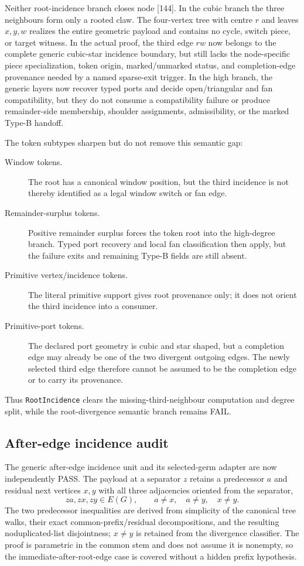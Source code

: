 \documentclass[11pt]{article}
\begin{document}
Neither root-incidence branch closes node [144].  In the cubic branch the
three neighbours form only a rooted claw.  The four-vertex tree with centre
$r$ and leaves $x,y,w$ realizes the entire geometric payload and contains no
cycle, switch piece, or target witness.  In the actual proof, the third edge
$rw$ now belongs to the complete generic cubic-star incidence boundary, but
still lacks the node-specific piece specialization, token origin,
marked/unmarked status, and completion-edge provenance needed by a named
sparse-exit trigger.  In the high branch, the generic layers now recover typed
ports and decide open/triangular and fan compatibility, but they do not consume
a compatibility failure or produce remainder-side membership, shoulder
assignments, admissibility, or the marked Type-B handoff.

The token subtypes sharpen but do not remove this semantic gap:
\begin{description}
\item[Window tokens.] The root has a canonical window position, but the third
incidence is not thereby identified as a legal window switch or fan edge.
\item[Remainder-surplus tokens.] Positive remainder surplus forces the token
root into the high-degree branch.  Typed port recovery and local fan
classification then apply, but the failure exits and remaining Type-B fields
are still absent.
\item[Primitive vertex/incidence tokens.] The literal primitive support gives
root provenance only; it does not orient the third incidence into a consumer.
\item[Primitive-port tokens.] The declared port geometry is cubic and star
shaped, but a completion edge may already be one of the two divergent outgoing
edges.  The newly selected third edge therefore cannot be assumed to be the
completion edge or to carry its provenance.
\end{description}
Thus \texttt{RootIncidence} clears the missing-third-neighbour computation and
degree split, while the root-divergence semantic branch remains FAIL.

\subsection*{After-edge incidence audit}
The generic after-edge incidence unit and its selected-germ adapter are now
independently PASS.  The payload at a separator $z$ retains a predecessor $a$
and residual next vertices $x,y$ with all three adjacencies oriented from the
separator,
\[
 za,zx,zy\in E(G),
 \qquad a\ne x,\quad a\ne y,\quad x\ne y.
\]
The two predecessor inequalities are derived from simplicity of the canonical
tree walks, their exact common-prefix/residual decompositions, and the
resulting noduplicated-list disjointness; $x\ne y$ is retained from the
divergence classifier.  The proof is parametric in the common stem and does
not assume it is nonempty, so the immediate-after-root-edge case is covered
without a hidden prefix hypothesis.
\end{document}

